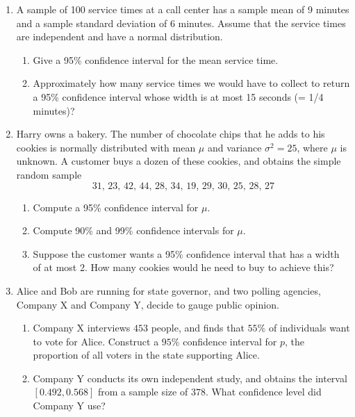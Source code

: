 \documentclass{article}    %
\begin{document}
	
	\begin{enumerate}
		\item A sample of 100 service times at a call center has a sample mean of 9 minutes and a sample standard deviation of 6 minutes. Assume that the service times are independent and have a normal distribution.
		\begin{enumerate}
			\item Give a 95\% confidence interval for the mean service time.
			
			\item Approximately how many service times we would have to collect
			to return a 95\% confidence interval whose width is at most 15 seconds (= 1/4 minutes)?
		\end{enumerate}

		\item Harry owns a bakery. The number of chocolate chips that he adds to his cookies is normally distributed with mean $\mu$ and variance $\sigma^2 = 25$, where $\mu$ is unknown. 
		A customer buys a dozen of these cookies, and obtains the simple random sample
		$$
		31, \, 23, \, 42, \, 44, \, 28, \, 34, \, 19, \, 29, \, 30, \, 25, \, 28, \, 27
		$$
		\begin{enumerate}
			\item Compute a 95\% confidence interval for $\mu$. 

			\item  Compute 90\% and 99\% confidence intervals for $\mu$.
			
			\item  Suppose the customer wants a 95\% confidence interval that has a width of at most 2. How many cookies would he need to buy to achieve this?
		\end{enumerate}
		
		\item Alice and Bob are running for state governor, and two polling agencies, Company X and Company Y, decide to gauge public opinion.
		\begin{enumerate}
			\item Company X interviews $453$ people, and finds that $55\%$ of individuals want to vote for Alice. Construct a $95\%$ confidence interval for $p$, the proportion of all voters in the state supporting Alice. 

			\item  Company Y conducts its own independent study, and obtains the interval $[0.492,0.568]$ from a sample size of $378$. What confidence level did Company Y use?


\end{enumerate}
\end{enumerate}
\end{document}
